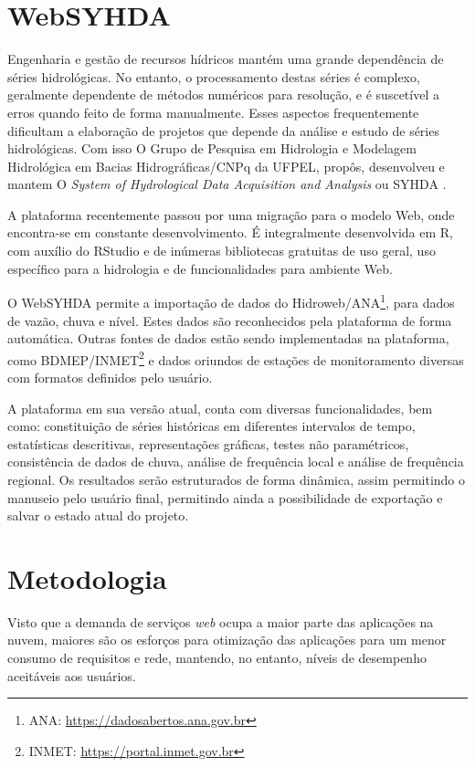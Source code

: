 \documentclass[12pt,english,brazil]{article}
\begin{document}
\section{WebSYHDA}\label{sec:websyhda}

Engenharia e gestão de recursos hídricos mantém uma grande dependência de séries hidrológicas. No entanto, o processamento destas séries é complexo, geralmente dependente de métodos numéricos para resolução, e é suscetível a erros quando feito de forma manualmente. Esses aspectos frequentemente dificultam a elaboração de projetos que depende da análise e estudo de séries hidrológicas. Com isso O Grupo de Pesquisa em Hidrologia e Modelagem Hidrológica em Bacias Hidrográficas/CNPq da UFPEL, propôs, desenvolveu e mantem O \emph{System of Hydrological Data Acquisition and Analysis} ou SYHDA \cite{syhda}.

A plataforma recentemente passou por uma migração para o modelo Web, onde encontra-se em constante desenvolvimento. É integralmente desenvolvida em R, com auxílio do RStudio e de inúmeras bibliotecas gratuitas de uso geral, uso específico para a hidrologia e de funcionalidades para ambiente Web. %

O WebSYHDA permite a importação de dados do Hidroweb/ANA\footnote{ANA: \url{https://dadosabertos.ana.gov.br}}, para dados de vazão, chuva e nível. Estes dados são reconhecidos pela plataforma de forma automática. Outras fontes de dados estão sendo implementadas na plataforma, como BDMEP/INMET\footnote{INMET: \url{https://portal.inmet.gov.br}} e dados oriundos de estações de monitoramento diversas com formatos definidos pelo usuário.

A plataforma em sua versão atual, conta com diversas funcionalidades, bem como: constituição de séries históricas em diferentes intervalos de tempo, estatísticas descritivas, representações gráficas, testes não paramétricos, consistência de dados de chuva, análise de frequência local e análise de frequência regional. Os resultados serão estruturados de forma dinâmica, assim permitindo o manuseio pelo usuário final, permitindo ainda a possibilidade de exportação e salvar o estado atual do projeto. 

\section{Metodologia} \label{sec:metodologia}

Visto que a demanda de serviços \textit{web} ocupa a maior parte das aplicações na nuvem, maiores são os esforços para otimização das aplicações para um menor consumo de requisitos e rede, mantendo, no entanto, níveis de desempenho aceitáveis aos usuários. 
\end{document}
